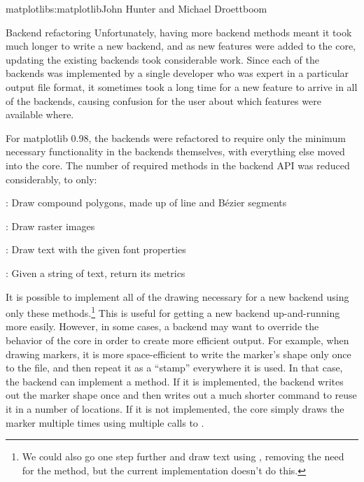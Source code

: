 \begin{aosachapter}{matplotlib}{s:matplotlib}{John Hunter and Michael Droettboom}
\begin{aosasect1}{Backend refactoring}
Unfortunately, having more backend methods meant it took much longer
to write a new backend, and as new features were added to the core,
updating the existing backends took considerable work.  Since each of
the backends was implemented by a single developer who was expert in a
particular output file format, it sometimes took a long time for a new
feature to arrive in all of the backends, causing confusion for the
user about which features were available where.

For matplotlib 0.98, the backends were refactored to require only the
minimum necessary functionality in the backends themselves, with
everything else moved into the core.  The number of required methods
in the backend API was reduced considerably, to only:

\begin{aosaitemize}

  \item {}: Draw compound polygons, made up of line and
    B\'ezier segments

  \item {}: Draw raster images

  \item {}: Draw text with the given font properties

  \item {}: Given a string of
    text, return its metrics

\end{aosaitemize}

It is possible to implement all of the drawing necessary for a new
backend using only these methods.\footnote{We could also go one step
  further and draw text using , removing the need for
  the  method, but the current implementation doesn't
  do this.}  This is useful for getting a new backend up-and-running
more easily.  However, in some cases, a backend may want to override
the behavior of the core in order to create more efficient output.
For example, when drawing markers, it is more space-efficient to write
the marker's shape only once to the file, and then repeat it as a
``stamp'' everywhere it is used.  In that case, the backend can
implement a  method.  If it is implemented, the
backend writes out the marker shape once and then writes out a much
shorter command to reuse it in a number of locations.  If it is not
implemented, the core simply draws the marker multiple times using
multiple calls to .


\end{aosasect1}
\end{aosachapter}
